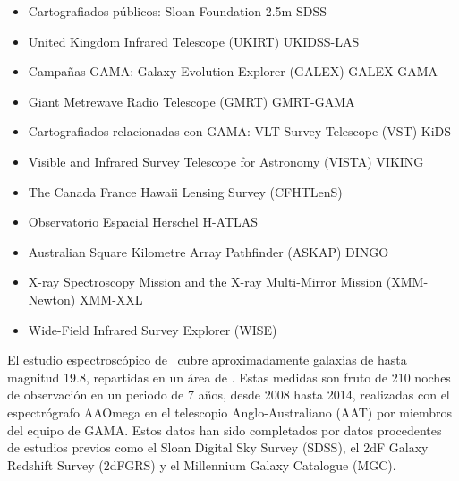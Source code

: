 \vspace{-3mm}

\begin{itemize}
    \setlength\itemsep{-1mm}
    
    \item Cartografiados públicos: Sloan Foundation 2.5m SDSS
    
    \item United Kingdom Infrared Telescope (UKIRT) UKIDSS-LAS
    
    \item Campañas GAMA: Galaxy Evolution Explorer (GALEX) GALEX-GAMA
    
    \item Giant Metrewave Radio Telescope (GMRT) GMRT-GAMA
    
    \item Cartografiados relacionadas con GAMA:  VLT Survey Telescope (VST) KiDS
    
    \item Visible and Infrared Survey Telescope for Astronomy (VISTA) VIKING
    
    \item The Canada France Hawaii Lensing Survey  (CFHTLenS)
    
    \item Observatorio Espacial Herschel H-ATLAS
    
    \item Australian Square Kilometre Array Pathfinder (ASKAP) DINGO
    
    \item X-ray Spectroscopy Mission and the X-ray Multi-Mirror Mission (XMM-Newton) XMM-XXL
    
    \item Wide-Field Infrared Survey Explorer (WISE)
    
\end{itemize}

El estudio espectroscópico de \gama\ cubre aproximadamente   galaxias de hasta magnitud 19.8, repartidas en un área de . Estas medidas son fruto de 210 noches de observación en un periodo de 7 años, desde 2008 hasta 2014, realizadas con el espectrógrafo AAOmega en el telescopio Anglo-Australiano (AAT) por miembros del equipo de GAMA. Estos datos han sido completados por datos procedentes de estudios previos como el Sloan Digital Sky Survey (SDSS), el 2dF Galaxy Redshift Survey (2dFGRS) y el Millennium Galaxy Catalogue (MGC). 

